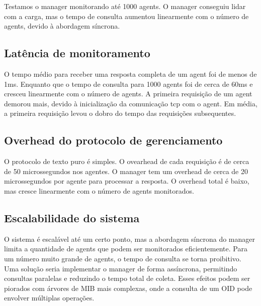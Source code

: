 \documentclass[12pt,a4paper]{article}
\begin{document}
Testamos o manager monitorando até 1000 agents. O manager conseguiu lidar com a carga, mas o tempo de consulta aumentou linearmente com o número de agents, devido à abordagem síncrona.

\subsection{Latência de monitoramento}

O tempo médio para receber uma resposta completa de um agent foi de menos de 1ms.
Enquanto que o tempo de consulta para 1000 agents foi de cerca de 60ms e cresceu linearmente com o número de agents.
A primeira requisição de um agent demorou mais, devido à inicialização da comunicação tcp com o agent. Em média, a primeira requisição levou o dobro do tempo das requisições subsequentes.

\subsection{Overhead do protocolo de gerenciamento}

O protocolo de texto puro é simples. O ovearhead de cada requisição é de cerca de 50 microssegundos nos agentes. O manager tem um overhead de cerca de 20 microssegundos por agente para processar a resposta. O overhead total é baixo, mas cresce linearmente com o número de agents monitorados.

\subsection{Escalabilidade do sistema}

O sistema é escalável até um certo ponto, mas a abordagem síncrona do manager limita a quantidade de agents que podem ser monitorados eficientemente. Para um número muito grande de agents, o tempo de consulta se torna proibitivo. Uma solução seria implementar o manager de forma assíncrona, permitindo consultas paralelas e reduzindo o tempo total de coleta. Esses efeitos podem ser piorados com árvores de MIB mais complexas, onde a consulta de um OID pode envolver múltiplas operações.
\end{document}
